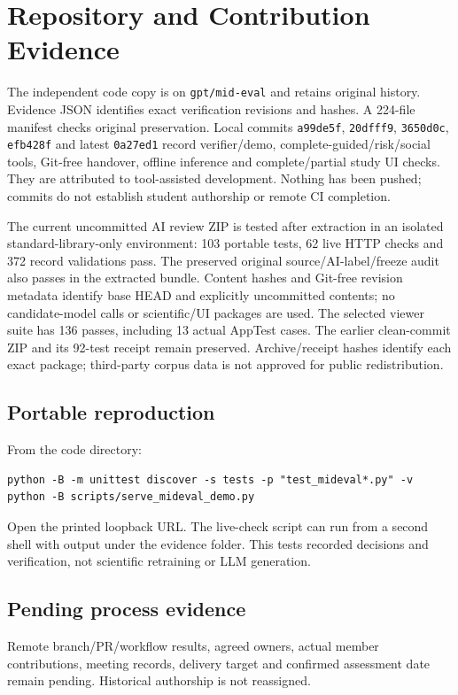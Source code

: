 \chapter{Repository and Contribution Evidence}
The independent code copy is on \texttt{gpt/mid-eval} and retains original history. Evidence JSON identifies exact verification revisions and hashes. A 224-file manifest checks original preservation.
Local commits \texttt{a99de5f}, \texttt{20dfff9}, \texttt{3650d0c}, \texttt{efb428f} and latest \texttt{0a27ed1} record verifier/demo, complete-guided/risk/social tools, Git-free handover, offline inference and complete/partial study UI checks. They are attributed to tool-assisted development. Nothing has been pushed; commits do not establish student authorship or remote CI completion.

The current uncommitted AI review ZIP is tested after extraction in an isolated standard-library-only environment: 103 portable tests, 62 live HTTP checks and 372 record validations pass. The preserved original source/AI-label/freeze audit also passes in the extracted bundle. Content hashes and Git-free revision metadata identify base HEAD and explicitly uncommitted contents; no candidate-model calls or scientific/UI packages are used. The selected viewer suite has 136 passes, including 13 actual AppTest cases. The earlier clean-commit ZIP and its 92-test receipt remain preserved. Archive/receipt hashes identify each exact package; third-party corpus data is not approved for public redistribution.
\section*{Portable reproduction}
From the code directory:
\begin{verbatim}
python -B -m unittest discover -s tests -p "test_mideval*.py" -v
python -B scripts/serve_mideval_demo.py
\end{verbatim}
Open the printed loopback URL. The live-check script can run from a second shell with output under the evidence folder. This tests recorded decisions and verification, not scientific retraining or LLM generation.
\section*{Pending process evidence}
Remote branch/PR/workflow results, agreed owners, actual member contributions, meeting records, delivery target and confirmed assessment date remain pending. Historical authorship is not reassigned.
